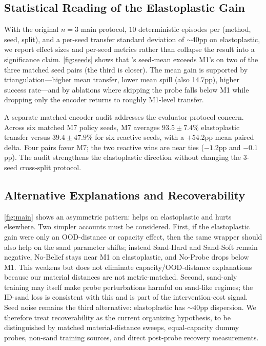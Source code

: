 \subsection{Statistical Reading of the Elastoplastic Gain}
\label{sec:results_stats}

With the original $n=3$ main protocol, $10$ deterministic episodes per (method, seed, split), and a per-seed transfer standard deviation of $\sim$40pp on elastoplastic, we report effect sizes and per-seed metrics rather than collapse the result into a significance claim. \cref{fig:seeds} shows that \PTA{}'s seed-mean exceeds M1's on two of the three matched seed pairs (the third is closer). The mean gain is supported by triangulation---higher mean transfer, lower mean spill (also 14.7pp), higher success rate---and by ablations where skipping the probe falls below M1 while dropping only the encoder returns to roughly M1-level transfer.



A separate matched-encoder audit addresses the evaluator-protocol concern. Across six matched M7 policy seeds, M7 averages $93.5\pm7.4$\% elastoplastic transfer versus $39.4\pm47.9$\% for six reactive seeds, with a $+54.2$pp mean paired delta. Four pairs favor M7; the two reactive wins are near ties ($-1.2$pp and $-0.1$pp). The audit strengthens the elastoplastic direction without changing the 3-seed cross-split protocol.

\subsection{Alternative Explanations and Recoverability}
\label{sec:results_analysis}

\cref{fig:main} shows an asymmetric pattern: \PTA{} helps on elastoplastic and hurts elsewhere. Two simpler accounts must be considered. First, if the elastoplastic gain were only an OOD-distance or capacity effect, then the same wrapper should also help on the sand parameter shifts; instead Sand-Hard and Sand-Soft remain negative, No-Belief stays near M1 on elastoplastic, and No-Probe drops below M1. This weakens but does not eliminate capacity/OOD-distance explanations because our material distances are not metric-matched. Second, sand-only training may itself make probe perturbations harmful on sand-like regimes; the ID-sand loss is consistent with this and is part of the intervention-cost signal. Seed noise remains the third alternative: elastoplastic has $\sim$40pp dispersion. We therefore treat recoverability as the current organizing hypothesis, to be distinguished by matched material-distance sweeps, equal-capacity dummy probes, non-sand training sources, and direct post-probe recovery measurements.

